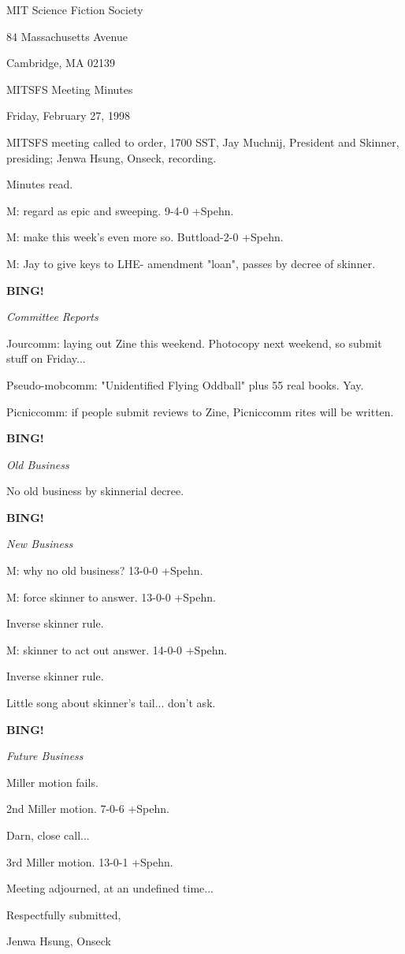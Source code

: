 \documentclass[12pt]{article}
\newcommand{\bing}{{\bf BING!} }
\newcommand{\goto}[1]{\bing \vskip 12pt \centerline{{\em{#1}}}}
\begin{document}
\begin{center}

MIT Science Fiction Society 

84 Massachusetts Avenue

Cambridge, MA 02139

\vspace{12pt}

MITSFS Meeting Minutes 

Friday, February 27, 1998

\end{center}
 
\vspace{18pt}

\setlength{\parskip}{6pt}

\noindent
MITSFS meeting called to order, 1700 SST,
Jay Muchnij, President and Skinner, presiding; Jenwa Hsung, Onseck, recording.

Minutes read.

M: regard as epic and sweeping. 9-4-0 +Spehn.

M: make this week's even more so. Buttload-2-0 +Spehn.

M: Jay to give keys to LHE- amendment "loan", passes by decree of skinner.

\goto{Committee Reports}

Jourcomm: laying out Zine this weekend. Photocopy next weekend, so submit stuff on Friday...

Pseudo-mobcomm: "Unidentified Flying Oddball" plus 55 real books. Yay.

Picniccomm: if people submit reviews to Zine, Picniccomm rites will be written.

\goto{Old Business}

No old business by skinnerial decree.

\goto{New Business}

M: why no old business? 13-0-0 +Spehn.

M: force skinner to answer. 13-0-0 +Spehn.

Inverse skinner rule.

M: skinner to act out answer. 14-0-0 +Spehn.

Inverse skinner rule.

Little song about skinner's tail... don't ask.

\goto{Future Business}

Miller motion fails.

2nd Miller motion. 7-0-6 +Spehn.

Darn, close call...

3rd Miller motion. 13-0-1 +Spehn.

\vspace{12pt}

\noindent
Meeting adjourned, at an undefined time...

\vspace{18pt}

\centerline{Respectfully submitted,}
\centerline{Jenwa Hsung, Onseck}
\end{document}
